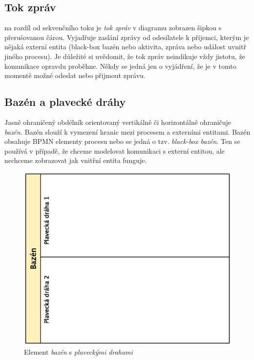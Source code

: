 \subsection{Tok zpráv}
na rozdíl od sekvenčního toku je \textit{tok zpráv} v diagramu zobrazen šipkou s přerušovanou čárou. Vyjadřuje zaslání zprávy od odesílatele k příjemci, kterým je nějaká externí entita (black-box bazén nebo aktivita, zpráva nebo událost uvnitř jiného procesu). Je důležité si uvědomit, že tok zpráv neindikuje vždy jistotu, že komunikace opravdu proběhne. Někdy se jedná jen o vyjádření, že je v tomto momentě možné odeslat nebo přijmout zprávu.

\subsection{Bazén a plavecké dráhy}
Jasně ohraničený obdélník orientovaný vertikálně či horizontálně ohraničuje \textit{bazén}. Bazén slouží k vymezení hranic mezi procesem a externími entitami. Bazén obsahuje BPMN elementy procesu nebo se jedná o tzv.\textit{ black-box bazén}. Ten se používá v případě, že chceme modelovat komunikaci s externí entitou, ale nechceme zobrazovat jak vnitřní entita funguje.

\begin{figure}[htbp]\centering
\includegraphics[scale=0.7]{obrazky/pool-swimming_lane}
\caption{Element \textit{bazén} s \textit{plaveckými drahami}}
\label{fig:bazen}
\end{figure}

